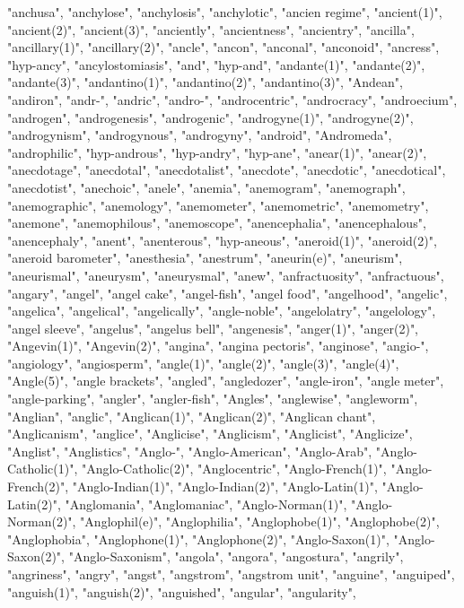 "anchusa",
"anchylose",
"anchylosis",
"anchylotic",
"ancien regime",
"ancient(1)",
"ancient(2)",
"ancient(3)",
"anciently",
"ancientness",
"ancientry",
"ancilla",
"ancillary(1)",
"ancillary(2)",
"ancle",
"ancon",
"anconal",
"anconoid",
"ancress",
"hyp-ancy",
"ancylostomiasis",
"and",
"hyp-and",
"andante(1)",
"andante(2)",
"andante(3)",
"andantino(1)",
"andantino(2)",
"andantino(3)",
"Andean",
"andiron",
"andr-",
"andric",
"andro-",
"androcentric",
"androcracy",
"androecium",
"androgen",
"androgenesis",
"androgenic",
"androgyne(1)",
"androgyne(2)",
"androgynism",
"androgynous",
"androgyny",
"android",
"Andromeda",
"androphilic",
"hyp-androus",
"hyp-andry",
"hyp-ane",
"anear(1)",
"anear(2)",
"anecdotage",
"anecdotal",
"anecdotalist",
"anecdote",
"anecdotic",
"anecdotical",
"anecdotist",
"anechoic",
"anele",
"anemia",
"anemogram",
"anemograph",
"anemographic",
"anemology",
"anemometer",
"anemometric",
"anemometry",
"anemone",
"anemophilous",
"anemoscope",
"anencephalia",
"anencephalous",
"anencephaly",
"anent",
"anenterous",
"hyp-aneous",
"aneroid(1)",
"aneroid(2)",
"aneroid barometer",
"anesthesia",
"anestrum",
"aneurin(e)",
"aneurism",
"aneurismal",
"aneurysm",
"aneurysmal",
"anew",
"anfractuosity",
"anfractuous",
"angary",
"angel",
"angel cake",
"angel-fish",
"angel food",
"angelhood",
"angelic",
"angelica",
"angelical",
"angelically",
"angle-noble",
"angelolatry",
"angelology",
"angel sleeve",
"angelus",
"angelus bell",
"angenesis",
"anger(1)",
"anger(2)",
"Angevin(1)",
"Angevin(2)",
"angina",
"angina pectoris",
"anginose",
"angio-",
"angiology",
"angiosperm",
"angle(1)",
"angle(2)",
"angle(3)",
"angle(4)",
"Angle(5)",
"angle brackets",
"angled",
"angledozer",
"angle-iron",
"angle meter",
"angle-parking",
"angler",
"angler-fish",
"Angles",
"anglewise",
"angleworm",
"Anglian",
"anglic",
"Anglican(1)",
"Anglican(2)",
"Anglican chant",
"Anglicanism",
"anglice",
"Anglicise",
"Anglicism",
"Anglicist",
"Anglicize",
"Anglist",
"Anglistics",
"Anglo-",
"Anglo-American",
"Anglo-Arab",
"Anglo-Catholic(1)",
"Anglo-Catholic(2)",
"Anglocentric",
"Anglo-French(1)",
"Anglo-French(2)",
"Anglo-Indian(1)",
"Anglo-Indian(2)",
"Anglo-Latin(1)",
"Anglo-Latin(2)",
"Anglomania",
"Anglomaniac",
"Anglo-Norman(1)",
"Anglo-Norman(2)",
"Anglophil(e)",
"Anglophilia",
"Anglophobe(1)",
"Anglophobe(2)",
"Anglophobia",
"Anglophone(1)",
"Anglophone(2)",
"Anglo-Saxon(1)",
"Anglo-Saxon(2)",
"Anglo-Saxonism",
"angola",
"angora",
"angostura",
"angrily",
"angriness",
"angry",
"angst",
"angstrom",
"angstrom unit",
"anguine",
"anguiped",
"anguish(1)",
"anguish(2)",
"anguished",
"angular",
"angularity",
